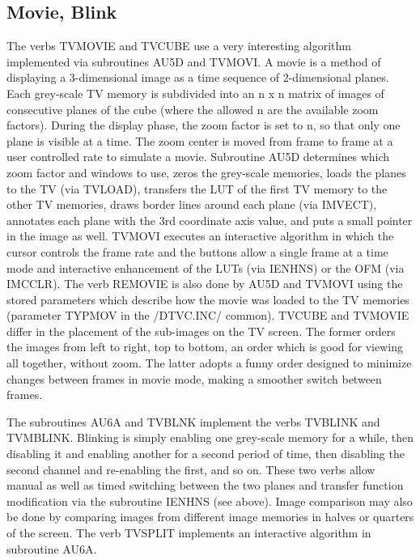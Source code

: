 \subsection{Movie, Blink}
The verbs TVMOVIE and TVCUBE use a very
interesting algorithm
implemented via subroutines AU5D and TVMOVI.  A movie is a
method of
displaying a 3-dimensional image as a time sequence of 2-dimensional
planes. Each grey-scale TV memory is subdivided into an n x n matrix
of images of consecutive planes of the cube (where the allowed n are
the available zoom factors).  During the display phase, the zoom
factor is set to n, so that only one plane is visible at a time.  The
zoom center is moved from frame to frame at a user controlled rate to
simulate a movie. Subroutine AU5D determines which zoom factor and
windows to use, zeros the grey-scale memories, loads the planes to the
TV (via TVLOAD), transfers the LUT of the first TV memory to the other
TV memories, draws border lines around each plane (via IMVECT),
annotates each plane with the 3rd coordinate axis value, and puts a
small pointer in the image as well.  TVMOVI executes an
interactive
algorithm in which the cursor controls the frame rate and the buttons
allow a single frame at a time mode and interactive enhancement of the
LUTs (via IENHNS) or the OFM (via IMCCLR).  The verb
REMOVIE is also
done by AU5D and TVMOVI using the stored parameters which describe how
the movie was loaded to the TV memories (parameter TYPMOV in the
/DTVC.INC/ common).  TVCUBE and TVMOVIE differ in the placement of the
sub-images on the TV screen.  The former orders the images from left
to right, top to bottom, an order which is good for viewing all
together, without zoom.  The latter adopts a funny order designed to
minimize changes between frames in movie mode, making a smoother
switch between frames.

The subroutines AU6A and TVBLNK implement
the verbs TVBLINK and
TVMBLINK.  Blinking is simply enabling one grey-scale memory for a
while, then disabling it and enabling another for a second period of
time, then disabling the second channel and re-enabling the first, and
so on.  These two verbs allow manual as well as timed switching
between the two planes and transfer function modification via the
subroutine IENHNS (see above).  Image comparison may also
be done by
comparing images from different image memories in halves or quarters
of the screen.  The verb TVSPLIT implements an interactive algorithm
in subroutine AU6A.

